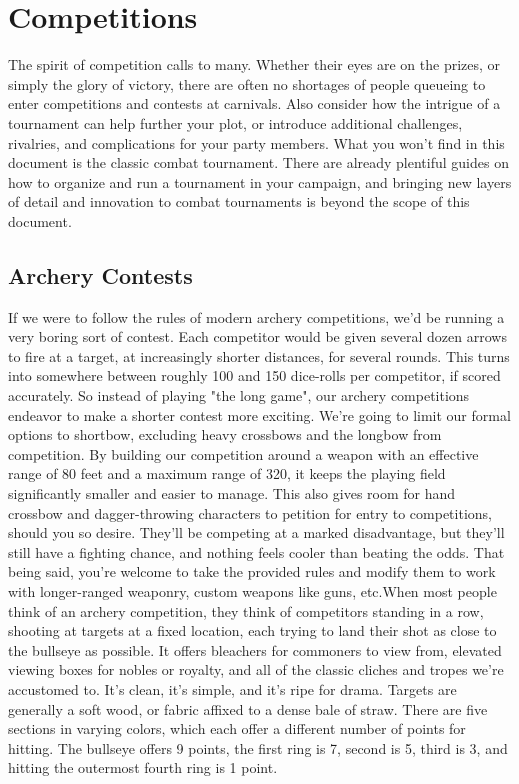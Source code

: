 \documentclass[10pt,a4paper,twoside,twocolumn,openany,bg=print,nodeprecatedcode]{dndbook}
\begin{document}
\chapter{Competitions}
The spirit of competition calls to many. Whether their eyes are on the prizes, or simply the glory of victory, there are often no shortages of people queueing to enter competitions and contests at carnivals. Also consider how the intrigue of a tournament can help further your plot, or introduce additional challenges, rivalries, and complications for your party members.
What you won't find in this document is the classic combat tournament. There are already plentiful guides on how to organize and run a tournament in your campaign, and bringing new layers of detail and innovation to combat tournaments is beyond the scope of this document.
\section{Archery Contests}
If we were to follow the rules of modern archery competitions, we'd be running a very boring sort of contest. Each competitor would be given several dozen arrows to fire at a target, at increasingly shorter distances, for several rounds. This turns into somewhere between roughly 100 and 150 dice-rolls per competitor, if scored accurately. So instead of playing "the long game", our archery competitions endeavor to make a shorter contest more exciting.
We're going to limit our formal options to shortbow, excluding heavy crossbows and the longbow from competition. By building our competition around a weapon with an effective range of 80 feet and a maximum range of 320, it keeps the playing field significantly smaller and easier to manage. This also gives room for hand crossbow and dagger-throwing characters to petition for entry to competitions, should you so desire. They'll be competing at a marked disadvantage, but they'll still have a fighting chance, and nothing feels cooler than beating the odds.
That being said, you're welcome to take the provided rules and modify them to work with longer-ranged weaponry, custom weapons like guns, etc.When most people think of an archery competition, they think of competitors standing in a row, shooting at targets at a fixed location, each trying to land their shot as close to the bullseye as possible. It offers bleachers for commoners to view from, elevated viewing boxes for nobles or royalty, and all of the classic cliches and tropes we're accustomed to. It's clean, it's simple, and it's ripe for drama.
Targets are generally a soft wood, or fabric affixed to a dense bale of straw. There are five sections in varying colors, which each offer a different number of points for hitting. The bullseye offers 9 points, the first ring is 7, second is 5, third is 3, and hitting the outermost fourth ring is 1 point.
\end{document}
